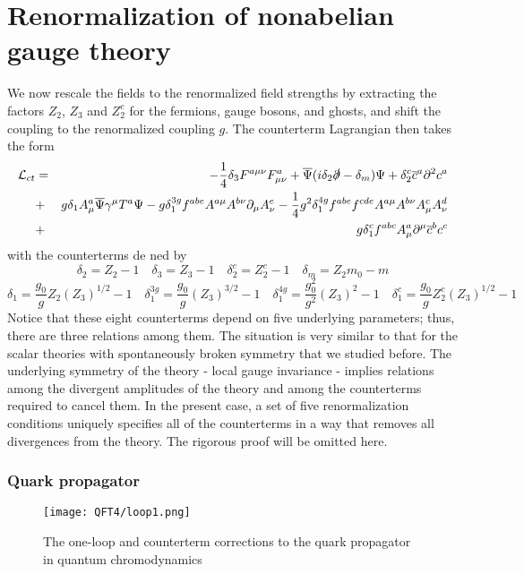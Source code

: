 \section{Renormalization of nonabelian gauge theory}
We now rescale the fields to the renormalized field strengths by extracting the factors $Z_2$, $Z_3$ and $Z_2^c$ for the fermions, gauge bosons, and ghosts, and shift the coupling to the renormalized coupling $g$. The counterterm Lagrangian then takes the form
\begin{eqnarray}
\mathcal{L}_{ct} &=& -\frac{1}{4}\delta_3 F^{a\mu\nu}F^a_{\mu\nu} + \overline{\Psi}(i\delta_2\slashed{\partial}-\delta_m)\Psi + \delta_2^c \overline{c}^a \partial^2 c^a \nonumber \\
&+& g\delta_1 A^a_{\mu}\overline{\Psi}\gamma^{\mu}T^a\Psi -g\delta_{1}^{3g} f^{abe}A^{a\mu}A^{b\nu}\partial_{\mu}A^e_{\nu} - \frac{1}{4}g^2\delta_1^{4g} f^{abe}f^{cde}A^{a\mu}A^{b\nu}A^c_{\mu}A^d_{\nu} \nonumber \\
&+& g\delta_1^c f^{abc}A^a_{\mu}\partial^{\mu}\overline{c}^b c^c \nonumber
\end{eqnarray}
with the counterterms de ned by
\[\delta_2 = Z_2 - 1 \quad \delta_3 = Z_3 - 1 \quad \delta_2^c = Z_2^c - 1 \quad \delta_m = Z_2m_0-m\]
\[\delta_1 = \frac{g_0}{g}Z_2(Z_3)^{1/2} - 1 \quad \delta_1^{3g} = \frac{g_0}{g}(Z_3)^{3/2} - 1 \quad \delta_1^{4g} = \frac{g_0^2}{g^2}(Z_3)^2 - 1 \quad \delta_1^c = \frac{g_0}{g}Z_2^c(Z_3)^{1/2} - 1\]
Notice that these eight counterterms depend on five underlying parameters; thus, there are three relations among them. The situation is very similar to that for the scalar theories with spontaneously broken symmetry that we studied before. 
The underlying symmetry of the theory - local gauge invariance - implies relations among the divergent amplitudes of the theory and among the counterterms required to cancel them. 
In the present case, a set of five renormalization conditions uniquely specifies all of the counterterms in a way that removes all divergences from the theory.
The rigorous proof will be omitted here.

\subsubsection{Quark propagator}
\begin{figure}[!h]
	\centering
	\texttt{[image: QFT4/loop1.png]}
	\caption{The one-loop and counterterm corrections to the quark propagator in quantum chromodynamics}
\end{figure}

